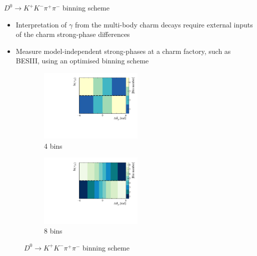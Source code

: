 \documentclass[xcolor={dvipsnames}]{beamer}
\begin{document}
\begin{frame}{$D^0\to K^+K^-\pi^+\pi^-$ binning scheme}
  \begin{itemize}
    \setlength\itemsep{0.5em}
    \item{Interpretation of $\gamma$ from the multi-body charm decays require external inputs of the charm strong-phase differences}
    \item{Measure model-independent strong-phases at a charm factory, such as BESIII, using an optimised binning scheme}
  \end{itemize}
  \begin{figure}
    \centering
    \begin{subfigure}{0.5\textwidth}
      \centering
      \includegraphics[height = 3.5cm]{Plots/BinningSchemePlot_4Bins.pdf}
      \vspace{-0.3cm}
      \caption*{4 bins}
    \end{subfigure}%
    \begin{subfigure}{0.5\textwidth}
      \centering
      \includegraphics[height = 3.5cm]{Plots/BinningSchemePlot_8Bins.pdf}
      \vspace{-0.3cm}
      \caption*{8 bins}
    \end{subfigure}
    \caption*{$D^0\to K^+K^-\pi^+\pi^-$ binning scheme}
  \end{figure}
\end{frame}
\end{document}
